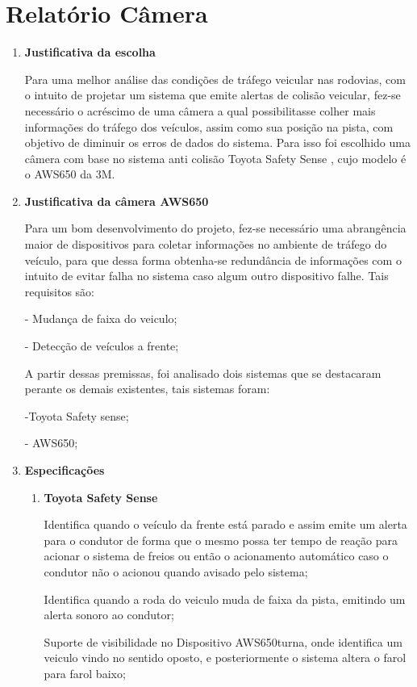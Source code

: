 \chapter[Relatório Câmera]{Relatório Câmera}
\begin{enumerate}
\item \textbf{Justificativa da escolha}

Para uma melhor análise das condições de tráfego veicular nas rodovias, com o
intuito de projetar um sistema que emite alertas de colisão veicular, fez-se
necessário o acréscimo de uma câmera a qual possibilitasse colher mais informações
do tráfego dos veículos, assim como sua posição na pista, com objetivo de
diminuir os erros de dados do sistema. Para isso foi escolhido uma câmera
com base no sistema anti colisão  Toyota Safety Sense \cite{toyota_safety}, cujo modelo é o AWS650 da 3M.

\item \textbf{Justificativa da câmera AWS650}

Para um bom desenvolvimento do projeto, fez-se necessário uma abrangência maior de dispositivos para coletar informações no ambiente de tráfego do veículo, para que dessa forma obtenha-se redundância de informações com o intuito de evitar falha no sistema  caso algum outro dispositivo falhe. Tais requisitos são:

-  Mudança de faixa do veiculo;

-  Detecção de veículos a frente;

A partir dessas premissas, foi analisado dois sistemas que se destacaram perante os demais existentes, tais sistemas foram:

-Toyota Safety sense;

- AWS650;

\item \textbf{Especificações}
\begin{enumerate}
\item \textbf{Toyota Safety Sense}

Identifica quando o veículo da frente está parado e assim emite um alerta para o condutor de forma que o mesmo possa ter tempo de reação para acionar o sistema de freios ou então o acionamento automático caso o condutor não o acionou quando avisado pelo sistema;

Identifica quando a roda do veiculo muda de faixa da pista, emitindo um alerta sonoro ao condutor;

Suporte de visibilidade no Dispositivo AWS650turna, onde identifica um veiculo vindo no sentido oposto, e posteriormente o sistema altera o farol para farol baixo;


\end{enumerate}
\end{enumerate}
